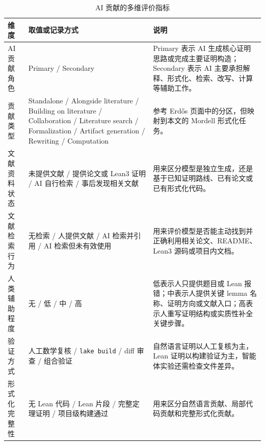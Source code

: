 \begin{table}[H]
\centering
\scriptsize
\setlength{\tabcolsep}{3pt}
\caption{AI 贡献的多维评价指标}
\label{tab:appendix-ai-evaluation-dimensions}
\begin{tabular}{@{}>{\raggedright\arraybackslash}p{}>{\raggedright\arraybackslash}p{}>{\raggedright\arraybackslash}p{}@{}}
\toprule
\textbf{维度} & \textbf{取值或记录方式} & \textbf{说明} \\
\midrule
AI 贡献角色 & Primary / Secondary & Primary 表示 AI 生成核心证明思路或完成主要证明构造；Secondary 表示 AI 主要承担解释、形式化、检索、改写、计算等辅助工作。 \\
贡献类型 & Standalone / Alongside literature / Building on literature / Collaboration / Literature search / Formalization / Artifact generation / Rewriting / Computation & 参考 Erdős 页面中的分区，但映射到本文的 Mordell 形式化任务。 \\
文献资料状态 & 未提供文献 / 提供论文或 Lean3 证明 / AI 自行检索 / 事后发现相关文献 & 用来区分模型是独立生成，还是基于已知证明路线、已有论文或已有形式化代码。 \\
文献检索行为 & 无检索 / 人提供文献 / AI 检索并引用 / AI 检索但未有效使用 & 用来评价模型是否能主动找到并正确利用相关论文、README、Lean3 源码或项目内文档。 \\
人类辅助程度 & 无 / 低 / 中 / 高 & 低表示人只提供题目或 Lean 报错；中表示人提供关键 lemma 名称、证明方向或文献入口；高表示人重写证明结构或实质性补全关键步骤。 \\
验证方式 & 人工数学复核 / \texttt{lake build} / diff 审查 / 组合验证 & 自然语言证明以人工复核为主，Lean 证明以构建验证为主，智能体实验还需检查文件差异。 \\
形式化完整性 & 无 Lean 代码 / Lean 片段 / 完整定理证明 / 项目级构建通过 & 用来区分自然语言贡献、局部代码贡献和完整形式化贡献。 \\
\bottomrule
\end{tabular}
\end{table}
